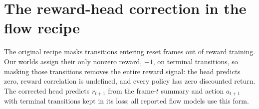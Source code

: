 \section{The reward-head correction in the flow recipe}
\label{app:rewardbug}

The original recipe masks transitions entering reset frames out of reward training. Our worlds assign
their only nonzero reward, $-1$, on terminal transitions, so masking those transitions removes the
entire reward signal: the head predicts zero, reward correlation is undefined, and every policy has
zero discounted return. The corrected head predicts $r_{t+1}$ from the frame-$t$ summary and action
$a_{t+1}$ with terminal transitions kept in its loss; all reported flow models use this form.
